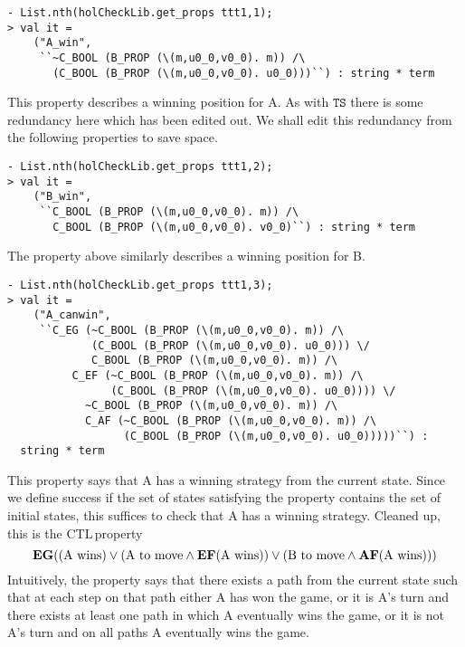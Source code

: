 \documentclass[12pt,fleqn]{article}
\newcommand{\ctl}{\textsf{CTL}\,}
\begin{document}
\begin{session}
\begin{verbatim}
- List.nth(holCheckLib.get_props ttt1,1);
> val it =
    ("A_win",
     ``~C_BOOL (B_PROP (\(m,u0_0,v0_0). m)) /\
       (C_BOOL (B_PROP (\(m,u0_0,v0_0). u0_0)))``) : string * term
\end{verbatim}
\end{session}

This property describes a winning position for A. As with \(\mathtt{TS}\) there is some redundancy here which has been edited out. We shall edit this redundancy from the following properties to save space.

\begin{session}
\begin{verbatim}
- List.nth(holCheckLib.get_props ttt1,2);
> val it =
    ("B_win",
     ``C_BOOL (B_PROP (\(m,u0_0,v0_0). m)) /\
       C_BOOL (B_PROP (\(m,u0_0,v0_0). v0_0)``) : string * term
\end{verbatim}
\end{session}

The property above similarly describes a winning position for B.

\begin{session}\begin{verbatim}
- List.nth(holCheckLib.get_props ttt1,3);
> val it =
    ("A_canwin",
     ``C_EG (~C_BOOL (B_PROP (\(m,u0_0,v0_0). m)) /\
             (C_BOOL (B_PROP (\(m,u0_0,v0_0). u0_0))) \/
             C_BOOL (B_PROP (\(m,u0_0,v0_0). m)) /\
          C_EF (~C_BOOL (B_PROP (\(m,u0_0,v0_0). m)) /\
                (C_BOOL (B_PROP (\(m,u0_0,v0_0). u0_0)))) \/
            ~C_BOOL (B_PROP (\(m,u0_0,v0_0). m)) /\
            C_AF (~C_BOOL (B_PROP (\(m,u0_0,v0_0). m)) /\
                  (C_BOOL (B_PROP (\(m,u0_0,v0_0). u0_0)))))``) :
  string * term
\end{verbatim}\end{session}

This property says that A has a winning strategy from the current state. Since we define success if the set of states satisfying the property contains the set of initial states, this suffices to check that A has a winning strategy. Cleaned up, this is the \ctl property \[ \mathbf{EG} (\textup{(A wins)} \lor (\textup{A to move} \land \mathbf{EF} (\textup{A wins})) \lor (\textup{B to move} \land \mathbf{AF} (\textup{A wins})))\] Intuitively, the property says that there exists a path from the current state such that at each step on that path either A has won the game, or it is A's turn and there exists at least one path in which A eventually wins the game, or it is not A's turn and on all paths A eventually wins the game.
\end{document}
